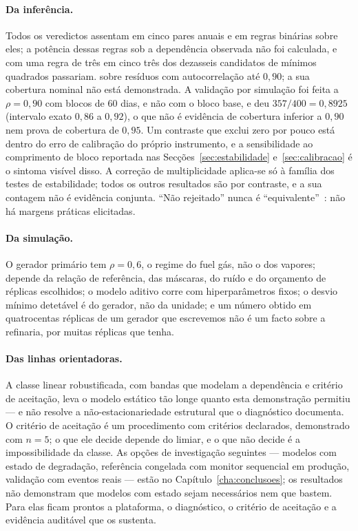 \paragraph{Da inferência.} Todos os veredictos assentam em cinco pares
anuais e em regras binárias sobre eles; a potência dessas regras sob a
dependência observada não foi calculada, e com uma regra de três em cinco
três dos dezasseis candidatos de mínimos quadrados passariam. 
sobre resíduos com autocorrelação até $0{,}90$; a sua cobertura nominal não
está demonstrada. A validação por simulação foi feita a $\rho = 0{,}90$ com
blocos de 60 dias, e não com o bloco base, e deu $357/400 = 0{,}8925$
(intervalo exato $0{,}86$ a $0{,}92$), o que não é evidência de cobertura
inferior a $0{,}90$ nem prova de cobertura de $0{,}95$. Um
contraste que exclui zero por pouco está dentro do erro de calibração do
próprio instrumento, e a sensibilidade ao comprimento de bloco reportada
nas Secções~\ref{sec:estabilidade} e~\ref{sec:calibracao} é o sintoma
visível disso. A correção de multiplicidade aplica-se só à família dos
testes de estabilidade; todos os outros resultados são por contraste, e a
sua contagem não é evidência conjunta. ``Não rejeitado'' nunca é
``equivalente''~\cite{Lakens2017}: não há margens práticas elicitadas.

\paragraph{Da simulação.} O gerador primário tem $\rho = 0{,}6$, o regime do
fuel gás, não o dos vapores; depende da relação de referência, das
máscaras, do ruído e do orçamento de réplicas escolhidos; o modelo aditivo
corre com hiperparâmetros fixos; o desvio mínimo detetável é do gerador, não
da unidade; e um número obtido em quatrocentas réplicas de um gerador que
escrevemos não é um facto sobre a refinaria, por muitas réplicas que tenha.

\paragraph{Das linhas orientadoras.} A classe linear robustificada, com
bandas que modelam a dependência e critério de aceitação, leva o modelo
estático tão longe quanto esta demonstração permitiu --- e não resolve a não-estacionariedade estrutural que o
diagnóstico documenta. O critério de aceitação é um procedimento com
critérios declarados, demonstrado com $n = 5$; o que ele decide depende do
limiar, e o que não decide é a impossibilidade da classe. As opções
de investigação seguintes --- modelos com estado de degradação, referência
congelada com monitor sequencial em produção, validação com eventos reais
--- estão no Capítulo~\ref{cha:conclusoes}; os resultados não demonstram que
modelos com estado sejam necessários nem que bastem. Para elas ficam prontos
a plataforma, o diagnóstico, o critério de aceitação e a evidência auditável
que os sustenta.
